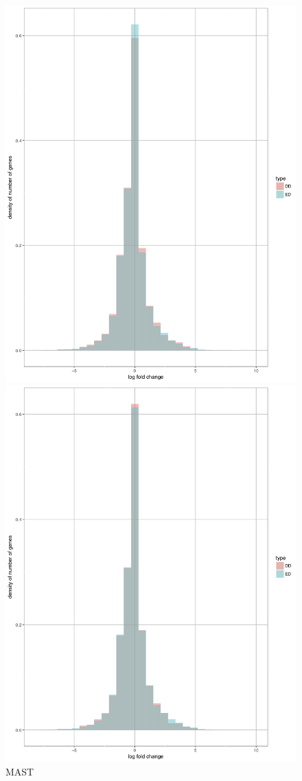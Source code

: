 \documentclass[11pt]{amsart}
\begin{document}
\begin{figure}[ht]
  \includegraphics[width=\linewidth]{DEC_EC_mast.png}
  \caption{MAST}
\endminipage\hfill
{}
  \includegraphics[width=\linewidth]{DEC_EC_scdd.png}

\end{figure}
\end{document}
